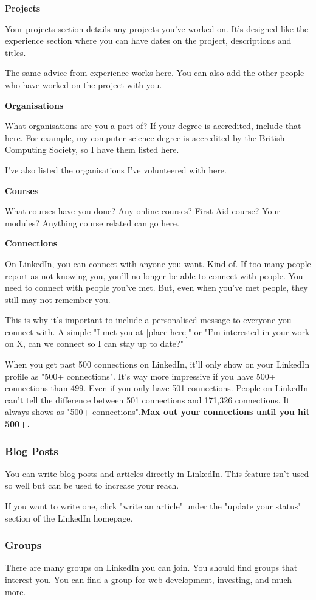 \documentclass{article}
\begin{document}
\textbf{Projects}

Your projects section details any projects you've worked on. It's
designed like the experience section where you can have dates on the
project, descriptions and titles.

The same advice from experience works here. You can also add the other
people who have worked on the project with you.

\textbf{Organisations}

What organisations are you a part of? If your degree is accredited,
include that here. For example, my computer science degree is accredited
by the British Computing Society, so I have them listed here.

I've also listed the organisations I've volunteered with here.

\textbf{Courses}

What courses have you done? Any online courses? First Aid course? Your
modules? Anything course related can go here.

\textbf{Connections}

On LinkedIn, you can connect with anyone you want. Kind of. If too many
people report as not knowing you, you'll no longer be able to connect
with people. You need to connect with people you've met. But, even when
you've met people, they still may not remember you.

This is why it's important to include a personalised message to everyone
you connect with. A simple "I met you at {[}place here{]}" or "I'm
interested in your work on X, can we connect so I can stay up to date?"

When you get past 500 connections on LinkedIn, it'll only show on your
LinkedIn profile as "500+ connections". It's way more impressive if
you have 500+ connections than 499. Even if you only have 501
connections. People on LinkedIn can't tell the difference between 501
connections and 171,326 connections. It always shows as "500+
connections".\textbf{Max out your connections until you hit 500+.}

\subsubsection{Blog Posts}
You can write blog posts and articles directly in LinkedIn. This feature
isn't used so well but can be used to increase your reach.

If you want to write one, click "write an article" under the "update
your status" section of the LinkedIn homepage.
\subsubsection{Groups}
There are many groups on LinkedIn you can join. You should find groups
that interest you. You can find a group for web development, investing,
and much more.
\end{document}
